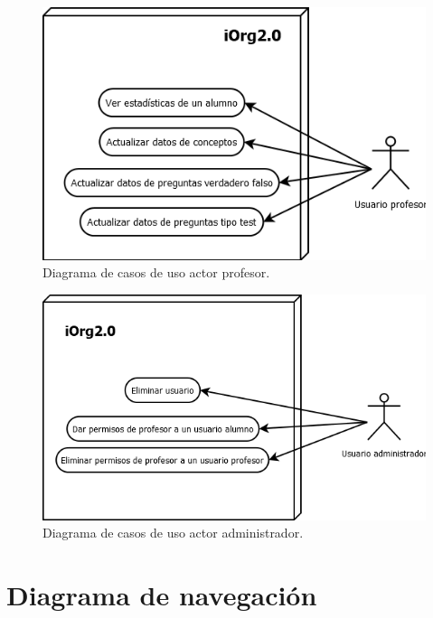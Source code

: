 \begin{figure}[!ht]
  \begin{center}
  \includegraphics[width=1\textwidth]{../images/cu_profesor.png}
  \caption{Diagrama de casos de uso actor profesor.}
  \label{fig:cu_profesor}
  \end{center}
\end{figure}

\begin{figure}[!ht]
  \begin{center}
  \includegraphics[width=1\textwidth]{../images/cu_administrador.png}
  \caption{Diagrama de casos de uso actor administrador.}
  \label{fig:cu_administrador}
  \end{center}
\end{figure}




\newpage

\section{Diagrama de navegación}

